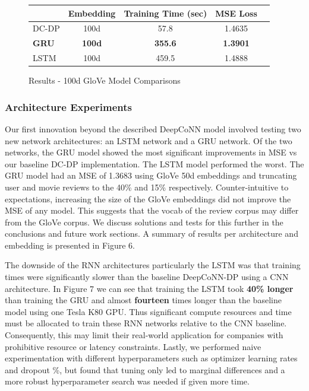 \documentclass[10pt,twocolumn,letterpaper]{article}
\begin{document}
\begin{figure}[!h]
\begin{center}
{\small
\begin{tabular}{l|cccc}
\hline
 & Embedding & Training Time (sec) & MSE Loss \\
\hline
DC-DP & 100d  & 57.8 & 1.4635   \\
\textbf{GRU}& \textbf{100d}& \textbf{355.6}& \textbf{1.3901} \\
LSTM & 100d & 459.5 & 1.4888  \\

\hline
\end{tabular}
}
\end{center}
\caption{Results - 100d GloVe Model Comparisons}
\end{figure}

\subsubsection{Architecture Experiments}
Our first innovation beyond the described DeepCoNN model involved testing two new network architectures: an LSTM network and a GRU network. Of the two networks, the GRU model showed the most significant improvements in MSE vs our baseline DC-DP implementation. The LSTM model performed the worst. The GRU model had an MSE of 1.3683 using GloVe 50d embeddings and truncating user and movie reviews to the 40\% and 15\% respectively. Counter-intuitive to expectations, increasing the size of the GloVe embeddings did not improve the MSE of any model. This suggests that the vocab of the review corpus may differ from the GloVe corpus. We discuss solutions and tests for this further in the conclusions and future work sections. A summary of results per architecture and embedding is presented in Figure 6.

The downside of the RNN architectures particularly the LSTM was that training times were significantly slower than the baseline DeepCoNN-DP using a CNN architecture. In Figure 7 we can see that training the LSTM took \textbf{40\% longer} than training the GRU and almost \textbf{fourteen} times longer than the baseline model using one Tesla K80 GPU. Thus significant compute resources and time must be allocated to train these RNN networks relative to the CNN baseline. Consequently, this may limit their real-world application for companies with prohibitive resource or latency constraints. Lastly, we performed naive experimentation with different hyperparameters such as optimizer learning rates and dropout \%, but found that tuning only led to marginal differences and a more robust hyperparameter search was needed if given more time.
\end{document}
